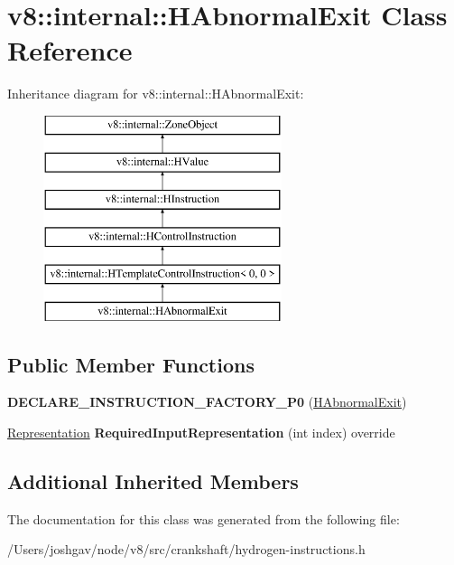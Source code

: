 \hypertarget{classv8_1_1internal_1_1_h_abnormal_exit}{}\section{v8\+:\+:internal\+:\+:H\+Abnormal\+Exit Class Reference}
\label{classv8_1_1internal_1_1_h_abnormal_exit}
Inheritance diagram for v8\+:\+:internal\+:\+:H\+Abnormal\+Exit\+:\begin{figure}[H]
\begin{center}
\leavevmode
\includegraphics[height=6.000000cm]{classv8_1_1internal_1_1_h_abnormal_exit}
\end{center}
\end{figure}
\subsection*{Public Member Functions}
\begin{DoxyCompactItemize}
\item 
{\bfseries D\+E\+C\+L\+A\+R\+E\+\_\+\+I\+N\+S\+T\+R\+U\+C\+T\+I\+O\+N\+\_\+\+F\+A\+C\+T\+O\+R\+Y\+\_\+\+P0} (\hyperlink{classv8_1_1internal_1_1_h_abnormal_exit}{H\+Abnormal\+Exit})\hypertarget{classv8_1_1internal_1_1_h_abnormal_exit_a7fa4608994ef0f61584ef1f47cbafb55}{}\label{classv8_1_1internal_1_1_h_abnormal_exit_a7fa4608994ef0f61584ef1f47cbafb55}

\item 
\hyperlink{classv8_1_1internal_1_1_representation}{Representation} {\bfseries Required\+Input\+Representation} (int index) override\hypertarget{classv8_1_1internal_1_1_h_abnormal_exit_a43ec1d43e65f73620a7f8ef548931bae}{}\label{classv8_1_1internal_1_1_h_abnormal_exit_a43ec1d43e65f73620a7f8ef548931bae}

\end{DoxyCompactItemize}
\subsection*{Additional Inherited Members}


The documentation for this class was generated from the following file\+:\begin{DoxyCompactItemize}
\item 
/\+Users/joshgav/node/v8/src/crankshaft/hydrogen-\/instructions.\+h\end{DoxyCompactItemize}
